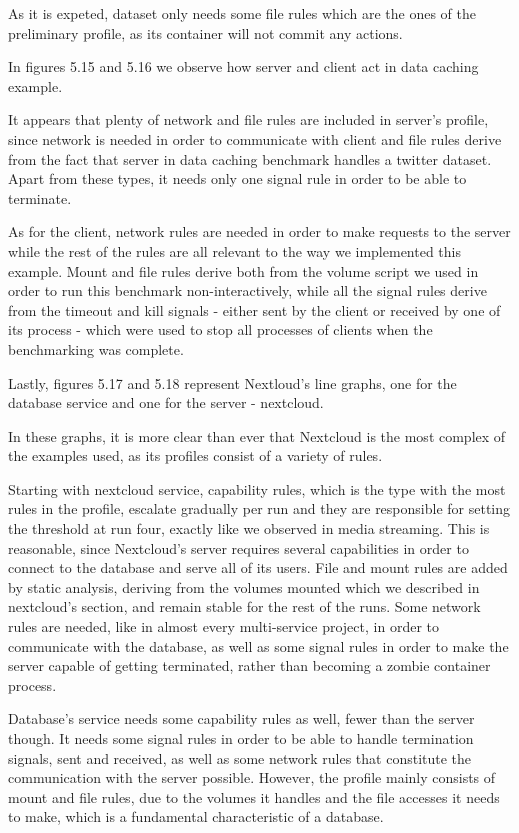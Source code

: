 As it is expeted, dataset only needs some file rules which are the ones of the preliminary profile, as its container will not commit any actions.

In figures 5.15 and 5.16 we observe how server and client act in data caching example. 

It appears that plenty of network and file rules are included in server's profile, since network is needed in order to communicate with client and file rules derive from the fact that server in data caching benchmark handles a twitter dataset. Apart from these types, it needs only one signal rule in order to be able to terminate.

As for the client, network rules are needed in order to make requests to the server while the rest of the rules are all relevant to the way we implemented this example. Mount and file rules derive both from the volume script we used in order to run this benchmark non-interactively, while all the signal rules derive from the timeout and kill signals - either sent by the client or received by one of its process - which were used to stop all processes of clients when the benchmarking was complete.

Lastly, figures 5.17 and 5.18 represent Nextloud's line graphs, one for the database service and one for the server - nextcloud.

In these graphs, it is more clear than ever that Nextcloud is the most complex of the examples used, as its profiles consist of a variety of rules. 

Starting with nextcloud service, capability rules, which is the type with the most rules in the profile, escalate gradually per run and they are responsible for setting the threshold at run four, exactly like we observed in media streaming. This is reasonable, since Nextcloud's server requires several capabilities in order to connect to the database and serve all of its users.  File and mount rules are added by static analysis, deriving from the volumes mounted which we described in nextcloud's section, and remain stable for the rest of the runs. Some network rules are needed, like in almost every multi-service project, in order to communicate with the database, as well as some signal rules in order to make the server capable of getting terminated, rather than becoming a zombie container process.

Database's service needs some capability rules as well, fewer than the server though. It needs some signal rules in order to be able to handle termination signals, sent and received, as well as some network rules that constitute the communication with the server possible. However, the profile mainly consists of mount and file rules, due to the volumes it handles and the file accesses it needs to make, which is a fundamental characteristic of a database.
 
